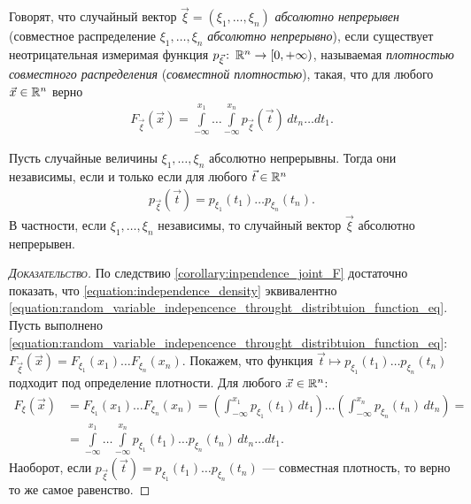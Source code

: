 \documentclass[../main.tex]{subfiles}
\begin{document}
\begin{df}
 Говорят, что случайный вектор $ \vec\xi = (\xi_1, \ldots, \xi_n) $ \textit{абсолютно непрерывен} (совместное распределение $ \xi_1,\ldots,\xi_n $ \textit{абсолютно непрерывно}), если существует неотрицательная измеримая функция $ p_{\vec\xi} \colon\, \mathbb{R}^{n}\to \left[0, +\infty\right)$, называемая \textit{плотностью совместного распределения} (\textit{совместной плотностью}), такая, что для любого $ \vec x \in \mathbb{R}^{n} $ верно
 \begin{align}
  \label{equation:density_of_joint_distribution}
  F_{\vec\xi}(\vec x) = \int\limits_{-\infty}^{x_1}  \ldots \int\limits_{-\infty}^{x_n} p_{\vec\xi}(\vec t) \, dt_n \ldots dt_1.
 \end{align} 
\end{df}
\begin{crly}
 Пусть случайные величины $\xi_1, \ldots, \xi_n $ абсолютно непрерывны. Тогда они независимы, если и только если для любого $ \vec t \in \mathbb{R}^{n} $
 \begin{align}
  \label{equation:independence_density}
  p_{\vec\xi}(\vec t) = p_{\xi_1}(t_1) \ldots p_{\xi_n}(t_n).
 \end{align} В частности, если $ \xi_1, \ldots, \xi_n $ независимы, то случайный вектор $ \vec\xi $ абсолютно непрерывен.
\end{crly}
\begin{proof}[\normalfont\textsc{Доказательство}]
 По следствию \ref{corollary:inpendence_joint_F} достаточно показать, что \eqref{equation:independence_density} эквивалентно \eqref{equation:random_variable_indepencence_throught_distribtuion_function_eq}. Пусть выполнено \eqref{equation:random_variable_indepencence_throught_distribtuion_function_eq}: $ F_{\vec\xi}(\vec x) = F_{\xi_1}(x_1) \ldots F_{\xi_n}(x_n) $. Покажем, что функция $ \vec t \mapsto p_{\xi_1}(t_1) \ldots p_{\xi_n}(t_n) $ подходит под определение плотности. Для любого $ \vec x \in \mathbb{R}^{n} $:
 \begin{align*}
  F_{\xi}(\vec x) &= F_{\xi_1}(x_1) \ldots F_{\xi_n}(x_n) = \left( \int_{-\infty}^{x_1} p_{\xi_1}(t_1)\,dt_1  \right) \ldots \left( \int_{-\infty}^{x_n} p_{\xi_n}(t_n)\,dt_n  \right) = \\
  &= \int\limits_{-\infty}^{x_1} \ldots \int\limits_{-\infty}^{x_n} p_{\xi_1}(t_1) \ldots p_{\xi_n}(t_n)\,dt_n \ldots dt_1.
 \end{align*} Наоборот, если $ p_{\vec\xi}(\vec t) = p_{\xi_1}(t_1) \ldots p_{\xi_n}(t_n) $ --- совместная плотность, то верно то же самое равенство.
\end{proof}
\end{document}
